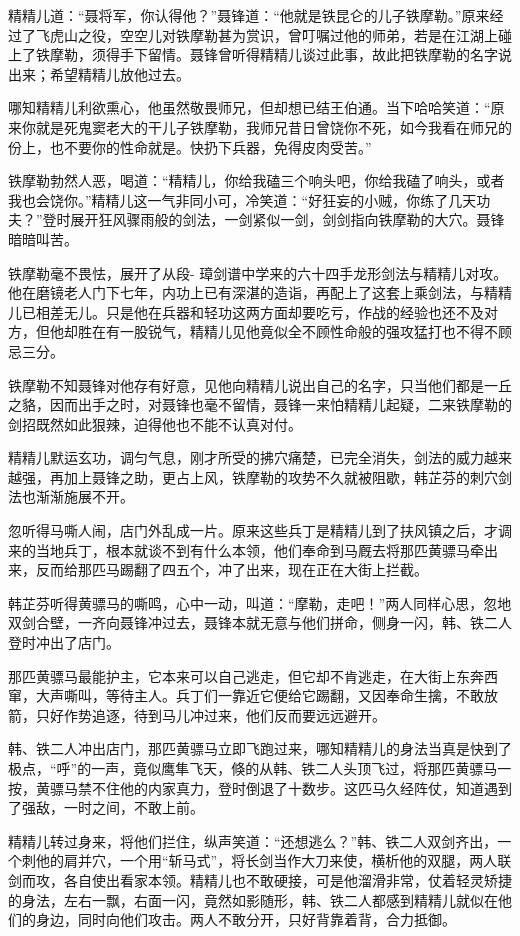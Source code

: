 \documentclass[12pt,oneside]{book}
\begin{document}
精精儿道：``聂将军，你认得他？''聂锋道：``他就是铁昆仑的儿子铁摩勒。''原来经过了飞虎山之役，空空儿对铁摩勒甚为赏识，曾叮嘱过他的师弟，若是在江湖上碰上了铁摩勒，须得手下留情。聂锋曾听得精精儿谈过此事，故此把铁摩勒的名字说出来；希望精精儿放他过去。

哪知精精儿利欲熏心，他虽然敬畏师兄，但却想已结王伯通。当下哈哈笑道：``原来你就是死鬼窦老大的干儿子铁摩勒，我师兄昔日曾饶你不死，如今我看在师兄的份上，也不要你的性命就是。快扔下兵器，免得皮肉受苦。''

铁摩勒勃然人恶，喝道：``精精儿，你给我磕三个响头吧，你给我磕了响头，或者我也会饶你。''精精儿这一气非同小可，冷笑道：``好狂妄的小贼，你练了几天功夫？''登时展开狂风骤雨般的剑法，一剑紧似一剑，剑剑指向铁摩勒的大穴。聂锋暗暗叫苦。

铁摩勒毫不畏怯，展开了从段-
璋剑谱中学来的六十四手龙形剑法与精精儿对攻。他在磨镜老人门下七年，内功上已有深湛的造诣，再配上了这套上乘剑法，与精精儿已相差无儿。只是他在兵器和轻功这两方面却要吃亏，作战的经验也还不及对方，但他却胜在有一股锐气，精精儿见他竟似全不顾性命般的强攻猛打也不得不顾忌三分。

铁摩勒不知聂锋对他存有好意，见他向精精儿说出自己的名字，只当他们都是一丘之貉，因而出手之时，对聂锋也毫不留情，聂锋一来怕精精儿起疑，二来铁摩勒的剑招既然如此狠辣，迫得他也不能不认真对付。

精精儿默运玄功，调匀气息，刚才所受的拂穴痛楚，已完全消失，剑法的威力越来越强，再加上聂锋之助，更占上风，铁摩勒的攻势不久就被阻歇，韩芷芬的刺穴剑法也渐渐施展不开。

忽听得马嘶人闹，店门外乱成一片。原来这些兵丁是精精儿到了扶风镇之后，才调来的当地兵丁，根本就谈不到有什么本领，他们奉命到马厩去将那匹黄骠马牵出来，反而给那匹马踢翻了四五个，冲了出来，现在正在大街上拦截。

韩芷芬听得黄骠马的嘶鸣，心中一动，叫道：``摩勒，走吧！''两人同样心思，忽地双剑合壁，一齐向聂锋冲过去，聂锋本就无意与他们拼命，侧身一闪，韩、铁二人登时冲出了店门。

那匹黄骠马最能护主，它本来可以自己逃走，但它却不肯逃走，在大街上东奔西窜，大声嘶叫，等待主人。兵丁们一靠近它便给它踢翻，又因奉命生擒，不敢放箭，只好作势追逐，待到马儿冲过来，他们反而要远远避开。

韩、铁二人冲出店门，那匹黄骠马立即飞跑过来，哪知精精儿的身法当真是快到了极点，``呼''的一声，竟似鹰隼飞天，倏的从韩、铁二人头顶飞过，将那匹黄骠马一按，黄骠马禁不住他的内家真力，登时倒退了十数步。这匹马久经阵仗，知道遇到了强敌，一时之间，不敢上前。

精精儿转过身来，将他们拦住，纵声笑道：``还想逃么？''韩、铁二人双剑齐出，一个刺他的肩并穴，一个用``斩马式''，将长剑当作大刀来使，横析他的双腿，两人联剑而攻，各自使出看家本领。精精儿也不敢硬接，可是他溜滑非常，仗着轻灵矫捷的身法，左右一飘，右面一闪，竟然如影随形，韩、铁二人都感到精精儿就似在他们的身边，同时向他们攻击。两人不敢分开，只好背靠着背，合力抵御。
\end{document}
